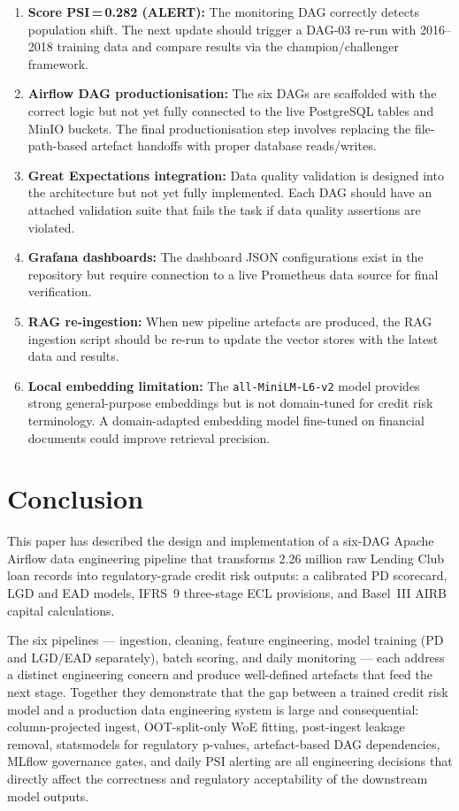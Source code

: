 \documentclass[12pt,a4paper]{report}
\begin{document}
\begin{enumerate}
  \item \textbf{Score PSI\,=\,0.282 (ALERT):} The monitoring DAG correctly detects population shift. The next update should trigger a DAG-03 re-run with 2016--2018 training data and compare results via the champion/challenger framework.
  \item \textbf{Airflow DAG productionisation:} The six DAGs are scaffolded with the correct logic but not yet fully connected to the live PostgreSQL tables and MinIO buckets. The final productionisation step involves replacing the file-path-based artefact handoffs with proper database reads/writes.
  \item \textbf{Great Expectations integration:} Data quality validation is designed into the architecture but not yet fully implemented. Each DAG should have an attached validation suite that fails the task if data quality assertions are violated.
  \item \textbf{Grafana dashboards:} The dashboard JSON configurations exist in the repository but require connection to a live Prometheus data source for final verification.
  \item \textbf{RAG re-ingestion:} When new pipeline artefacts are produced, the RAG ingestion script should be re-run to update the vector stores with the latest data and results.
  \item \textbf{Local embedding limitation:} The \texttt{all-MiniLM-L6-v2} model provides strong general-purpose embeddings but is not domain-tuned for credit risk terminology. A domain-adapted embedding model fine-tuned on financial documents could improve retrieval precision.
\end{enumerate}

\chapter{Conclusion}
\label{ch:conclusion}

This paper has described the design and implementation of a six-DAG Apache Airflow data engineering pipeline that transforms 2.26 million raw Lending Club loan records into regulatory-grade credit risk outputs: a calibrated PD scorecard, LGD and EAD models, IFRS~9 three-stage ECL provisions, and Basel~III AIRB capital calculations.

The six pipelines --- ingestion, cleaning, feature engineering, model training (PD and LGD/EAD separately), batch scoring, and daily monitoring --- each address a distinct engineering concern and produce well-defined artefacts that feed the next stage. Together they demonstrate that the gap between a trained credit risk model and a production data engineering system is large and consequential: column-projected ingest, OOT-split-only WoE fitting, post-ingest leakage removal, statsmodels for regulatory p-values, artefact-based DAG dependencies, MLflow governance gates, and daily PSI alerting are all engineering decisions that directly affect the correctness and regulatory acceptability of the downstream model outputs.
\end{document}
